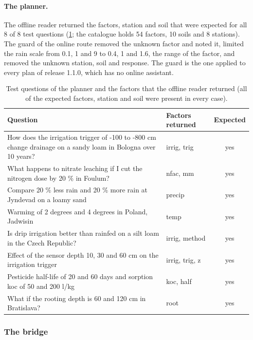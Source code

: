 \documentclass[preprint,12pt]{elsarticle}
\begin{document}
\paragraph{The planner.}
The offline reader returned the factors, station and soil that were expected for all 8 of 8 test questions (\cref{tab:planner}; the catalogue holds 54 factors, 10 soils and 8 stations). The guard of the online route removed the unknown factor and noted it, limited the rain scale from 0.1, 1 and 9 to 0.4, 1 and 1.6, the range of the factor, and removed the unknown station, soil and response. The guard is the one applied to every plan of release 1.1.0, which has no online assistant.
\begin{table}[H]\centering\small
\caption{Test questions of the planner and the factors that the offline reader returned (all of the expected factors, station and soil were present in every case).}\label{tab:planner}
\begin{tabularx}{\textwidth}{Xlc}\toprule Question & Factors returned & Expected\\\midrule
How does the irrigation trigger of -100 to -800 cm change drainage on a sandy loam in Bologna over 10 years? & irrig, trig & yes\\
What happens to nitrate leaching if I cut the nitrogen dose by 20 \% in Foulum? & nfac, mm & yes\\
Compare 20 \% less rain and 20 \% more rain at Jyndevad on a loamy sand & precip & yes\\
Warming of 2 degrees and 4 degrees in Poland, Jadwisin & temp & yes\\
Is drip irrigation better than rainfed on a silt loam in the Czech Republic? & irrig, method & yes\\
Effect of the sensor depth 10, 30 and 60 cm on the irrigation trigger & irrig, trig, z & yes\\
Pesticide half-life of 20 and 60 days and sorption koc of 50 and 200 l/kg & koc, half & yes\\
What if the rooting depth is 60 and 120 cm in Bratislava? & root & yes\\
\bottomrule\end{tabularx}\end{table}


\subsubsection{The bridge}
\end{document}
